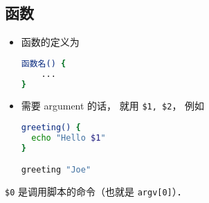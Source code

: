 \subsection{函数}

\begin{itemize}
\item 函数的定义为
\begin{lstlisting}[language=bash]
函数名() {
	...
}
\end{lstlisting}
\item 需要 argument 的话， 就用 \verb|$1, $2|， 例如
\begin{lstlisting}[language=bash]
greeting() {
  echo "Hello $1"
}

greeting "Joe"
\end{lstlisting}
\end{itemize}

\verb|$0| 是调用脚本的命令（也就是 \verb|argv[0]|）．
